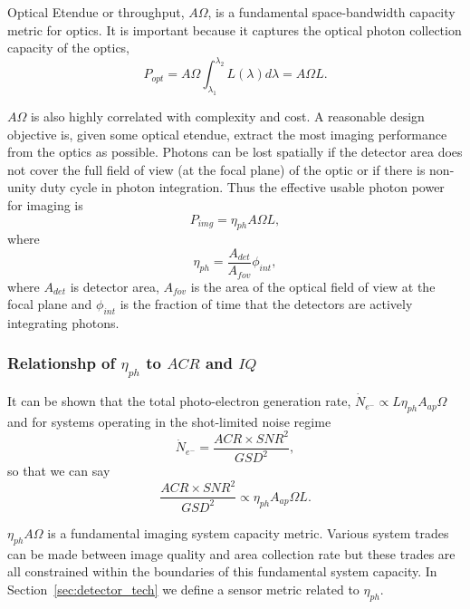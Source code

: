 \documentclass[10pt,journal]{IEEEtran}  %
\begin{document}
Optical Etendue or throughput, $A \Omega$, is a fundamental space-bandwidth capacity metric for optics.  It is important because it captures the optical photon collection capacity of the optics,
\begin{equation}
    P_{opt} = A\Omega \int_{\lambda_1}^{\lambda_2}L(\lambda) d\lambda = A\Omega L.
\end{equation}

$A\Omega$ is also highly correlated with complexity and cost.  A reasonable design objective is, given some optical etendue, extract the most imaging performance from the optics as possible.
Photons can be lost spatially if the detector area does not cover the full field of view (at the focal plane) of the optic or if there is non-unity duty cycle in photon integration.  Thus the effective usable photon power for imaging is
\begin{equation}
    P_{img} = \eta_{ph} A \Omega L ,
\end{equation}
where
\begin{equation}
    \eta_{ph} = \frac{A_{det}}{A_{fov}} \phi_{int},
\end{equation}
where $A_{det}$ is detector area, $A_{fov}$ is the area of the optical field of view at the focal plane and $\phi_{int}$ is the fraction of time that the detectors are actively integrating photons.  

\subsubsection{Relationshp of $\eta_{ph}$ to $ACR$ and $IQ$}

It can be shown that the total photo-electron generation rate, $\dot{N}_{e^-} \propto L\eta_{ph}A_{ap}\Omega$ and for systems operating in the shot-limited noise regime
\begin{equation}
    \dot{N}_{e^-} = \frac{ACR \times SNR^2}{GSD^2},
\end{equation}
so that we can say
\begin{equation}
\label{eq:acr_snr_gsd}
    \frac{ACR \times SNR^2}{GSD^2} \propto \eta_{ph} A_{ap}\Omega L.
\end{equation}

$\eta_{ph} A \Omega$ is a fundamental imaging system capacity metric.  Various system trades can be made between image quality and area collection rate but these trades are all constrained within the boundaries of this fundamental system capacity.  In Section~\ref{sec:detector_tech} we define a sensor metric related to $\eta_{ph}$.
\end{document}

